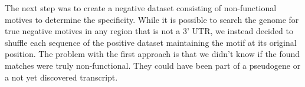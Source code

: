 The next step was to create a negative dataset consisting of non-functional motives to determine the specificity. While it is possible to search the genome for true negative motives in any region that is not a 3' UTR, we instead decided to shuffle each sequence of the positive dataset maintaining the motif at its original position. The problem with the first approach is that we didn't know if the found matches were truly non-functional. They could have been part of a pseudogene or a not yet discovered transcript. 
